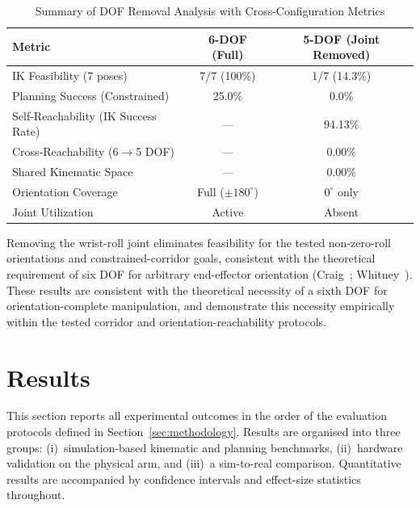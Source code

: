 \documentclass[conference]{IEEEtran}
\begin{document}
	\begin{table}[t]
		\centering
		\caption{Summary of DOF Removal Analysis with Cross-Configuration Metrics}
		\label{tab:ablation_summary}
		\begin{tabular}{l|c|c}
			\hline
			\textbf{Metric} & \textbf{6-DOF (Full)} & \textbf{5-DOF (Joint Removed)} \\
			\hline
			IK Feasibility (7 poses)                  & 7/7 (100\%)     & 1/7 (14.3\%)    \\
			Planning Success (Constrained)            & 25.0\%          & 0.0\%           \\
			Self-Reachability (IK Success Rate)       & ---             & 94.13\%         \\
			Cross-Reachability (6$\rightarrow$5 DOF)  & ---             & 0.00\%          \\
			Shared Kinematic Space                    & ---             & 0.00\%          \\
			Orientation Coverage                      & Full ($\pm180^\circ$) & $0^\circ$ only \\
			Joint Utilization                         & Active          & Absent          \\
			\hline
		\end{tabular}
	\end{table}
	
	Removing the wrist-roll joint eliminates feasibility for the tested
	non-zero-roll orientations and constrained-corridor goals, consistent
	with the theoretical requirement of six DOF for arbitrary end-effector
	orientation (Craig~\cite{craig2005introduction};
	Whitney~\cite{whitney1969resolved}). These results are consistent with
	the theoretical necessity of a sixth DOF for orientation-complete
	manipulation, and demonstrate this necessity empirically within the
	tested corridor and orientation-reachability protocols.
	
	
	\section{Results}
	\label{sec:results}
	
	This section reports all experimental outcomes in the order of the
	evaluation protocols defined in Section~\ref{sec:methodology}.
	Results are organised into three groups: (i)~simulation-based
	kinematic and planning benchmarks, (ii)~hardware validation on the
	physical arm, and (iii)~a sim-to-real comparison. Quantitative
	results are accompanied by confidence intervals and effect-size
	statistics throughout.
	
\end{document}
